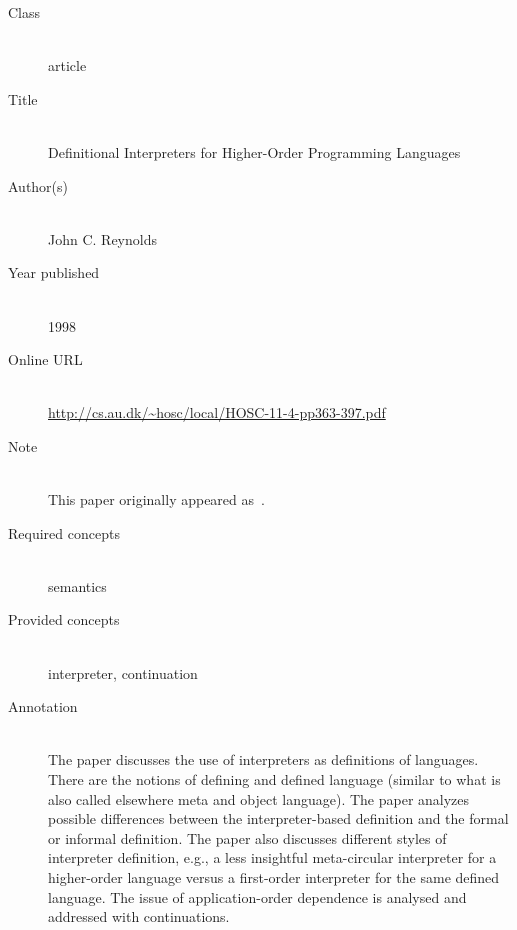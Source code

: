 \begin{description}
\item[Class]\mbox{}\\
article
\item[Title]\mbox{}\\
Definitional Interpreters for Higher-Order Programming Languages
\item[Author(s)]\mbox{}\\
John C. Reynolds\item[Year published]\mbox{}\\
1998
\item[Online URL]\mbox{}\\
{\footnotesize\url{http://cs.au.dk/~hosc/local/HOSC-11-4-pp363-397.pdf}}
\item[Note]\mbox{}\\
This paper originally appeared as~.
\item[Required concepts]\mbox{}\\
semantics\item[Provided concepts]\mbox{}\\
interpreter, continuation\item[Annotation]\mbox{}\\
The paper discusses the use of interpreters as definitions of languages. There are the notions of defining and defined language (similar to what is also called elsewhere meta and object language). The paper analyzes possible differences between the interpreter-based definition and the formal or informal definition. The paper also discusses different styles of interpreter definition, e.g., a less insightful meta-circular interpreter for a higher-order language versus a first-order interpreter for the same defined language. The issue of application-order dependence is analysed and addressed with continuations.
\end{description}

